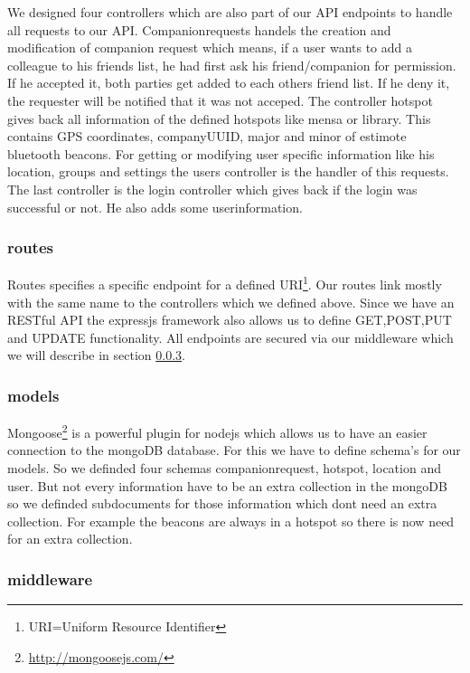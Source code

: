 We designed four controllers which are also part of our API endpoints to handle all requests to our API. Companionrequests handels the creation and modification of companion request which means, if a user wants to add a colleague to his friends list, he had first ask his friend/companion for permission. If he accepted it, both parties get added to each others friend list. If he deny it, the requester will be notified that it was not acceped. The controller hotspot gives back all information of the defined hotspots like mensa or library. This contains GPS coordinates, companyUUID, major and minor of estimote bluetooth beacons. For getting or modifying user specific information like his location, groups and settings the users controller is the handler of this requests. The last controller is the login controller which gives back if the login was successful or not. He also adds some userinformation.

\subsubsection{routes}

Routes specifies a specific endpoint for a defined URI\footnote{URI=Uniform Resource Identifier}. Our routes link mostly with the same name to the controllers which we defined above. Since we have an RESTful API the expressjs framework also allows us to define GET,POST,PUT and UPDATE functionality. All endpoints are secured via our middleware which we will describe in section \ref{backend-middleware}.

\subsubsection{models}

Mongoose\footnote{\url{http://mongoosejs.com/}} is a powerful plugin for nodejs which allows us to have an easier connection to the mongoDB database. For this we have to define schema's for our models. So we definded four schemas companionrequest, hotspot, location and user. But not every information have to be an extra collection in the mongoDB so we definded subdocuments for those information which dont need an extra collection. For example the beacons are always in a hotspot so there is now need for an extra collection.


\subsubsection{middleware}
\label{backend-middleware}

